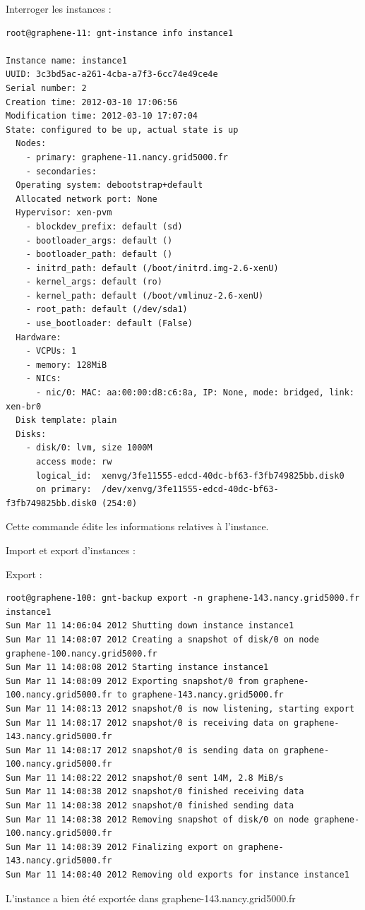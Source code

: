 Interroger les instances :
\begin{lstlisting}
root@graphene-11: gnt-instance info instance1

Instance name: instance1
UUID: 3c3bd5ac-a261-4cba-a7f3-6cc74e49ce4e
Serial number: 2
Creation time: 2012-03-10 17:06:56
Modification time: 2012-03-10 17:07:04
State: configured to be up, actual state is up
  Nodes:
    - primary: graphene-11.nancy.grid5000.fr
    - secondaries: 
  Operating system: debootstrap+default
  Allocated network port: None
  Hypervisor: xen-pvm
    - blockdev_prefix: default (sd)
    - bootloader_args: default ()
    - bootloader_path: default ()
    - initrd_path: default (/boot/initrd.img-2.6-xenU)
    - kernel_args: default (ro)
    - kernel_path: default (/boot/vmlinuz-2.6-xenU)
    - root_path: default (/dev/sda1)
    - use_bootloader: default (False)
  Hardware:
    - VCPUs: 1
    - memory: 128MiB
    - NICs:
      - nic/0: MAC: aa:00:00:d8:c6:8a, IP: None, mode: bridged, link: xen-br0
  Disk template: plain
  Disks:
    - disk/0: lvm, size 1000M
      access mode: rw
      logical_id:  xenvg/3fe11555-edcd-40dc-bf63-f3fb749825bb.disk0
      on primary:  /dev/xenvg/3fe11555-edcd-40dc-bf63-f3fb749825bb.disk0 (254:0)
\end{lstlisting}
Cette commande édite les informations relatives à l'instance.


Import et export d'instances :

Export :
\begin{lstlisting}
root@graphene-100: gnt-backup export -n graphene-143.nancy.grid5000.fr instance1
Sun Mar 11 14:06:04 2012 Shutting down instance instance1
Sun Mar 11 14:08:07 2012 Creating a snapshot of disk/0 on node graphene-100.nancy.grid5000.fr
Sun Mar 11 14:08:08 2012 Starting instance instance1
Sun Mar 11 14:08:09 2012 Exporting snapshot/0 from graphene-100.nancy.grid5000.fr to graphene-143.nancy.grid5000.fr
Sun Mar 11 14:08:13 2012 snapshot/0 is now listening, starting export
Sun Mar 11 14:08:17 2012 snapshot/0 is receiving data on graphene-143.nancy.grid5000.fr
Sun Mar 11 14:08:17 2012 snapshot/0 is sending data on graphene-100.nancy.grid5000.fr
Sun Mar 11 14:08:22 2012 snapshot/0 sent 14M, 2.8 MiB/s
Sun Mar 11 14:08:38 2012 snapshot/0 finished receiving data
Sun Mar 11 14:08:38 2012 snapshot/0 finished sending data
Sun Mar 11 14:08:38 2012 Removing snapshot of disk/0 on node graphene-100.nancy.grid5000.fr
Sun Mar 11 14:08:39 2012 Finalizing export on graphene-143.nancy.grid5000.fr
Sun Mar 11 14:08:40 2012 Removing old exports for instance instance1
\end{lstlisting}
L'instance a bien été exportée dans graphene-143.nancy.grid5000.fr

